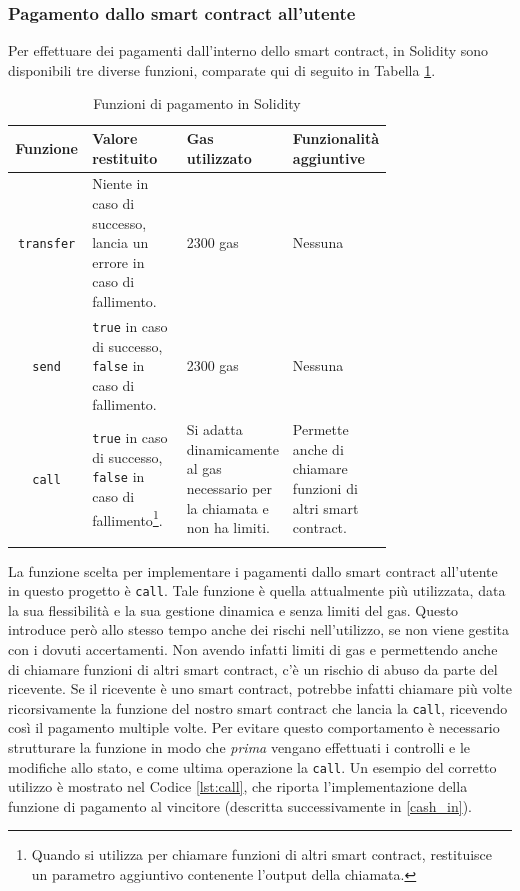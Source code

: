 \documentclass[12pt,a4paper,openright,twoside]{report}
\begin{document}
\subsubsection{Pagamento dallo smart contract all'utente}
Per effettuare dei pagamenti dall'interno dello smart contract, in Solidity sono disponibili tre diverse funzioni, comparate qui di seguito in Tabella \ref{tab:pay_functions}.
\newpage
\begin{center}
\begin{longtable}{c|m{0.25\linewidth}|m{0.25\linewidth}|m{0.25\linewidth}}
\textbf{Funzione} & \textbf{Valore restituito} & \textbf{Gas utilizzato} & \textbf{Funzionalità \linebreak aggiuntive}\\
\hline \hline
\texttt{transfer} & Niente in caso di successo, lancia un errore in caso di fallimento. & 2300 gas & Nessuna\\
\hline
\texttt{send} & \texttt{true} in caso di successo, \texttt{false} in caso di fallimento. & 2300 gas & Nessuna\\
\hline
\texttt{call} & \texttt{true} in caso di successo, \texttt{false} in caso di fallimento\footnote{Quando si utilizza per chiamare funzioni di altri smart contract, restituisce un parametro aggiuntivo contenente l'output della chiamata.}. & Si adatta dinamicamente al gas necessario per la chiamata e non ha limiti. & Permette anche di chiamare funzioni di altri smart contract.\\
\hline \hline
\caption[Funzioni di pagamento]{Funzioni di pagamento in Solidity\footnotemark}\label{tab:pay_functions}
\end{longtable}
\end{center}
La funzione scelta per implementare i pagamenti dallo smart contract all'utente in questo progetto è \texttt{call}. Tale funzione è quella attualmente più utilizzata, data la sua flessibilità e la sua gestione dinamica e senza limiti del gas. Questo introduce però allo stesso tempo anche dei rischi nell'utilizzo, se non viene gestita con i dovuti accertamenti. Non avendo infatti limiti di gas e permettendo anche di chiamare funzioni di altri smart contract, c'è un rischio di abuso da parte del ricevente. Se il ricevente è uno smart contract, potrebbe infatti chiamare più volte ricorsivamente la funzione del nostro smart contract che lancia la \texttt{call}, ricevendo così il pagamento multiple volte. Per evitare questo comportamento è necessario strutturare la funzione in modo che \textit{prima} vengano effettuati i controlli e le modifiche allo stato, e come ultima operazione la \texttt{call}. Un esempio del corretto utilizzo è mostrato nel Codice \ref{lst:call}, che riporta l'implementazione della funzione di pagamento al vincitore (descritta successivamente in \ref{cash_in}).
\end{document}
